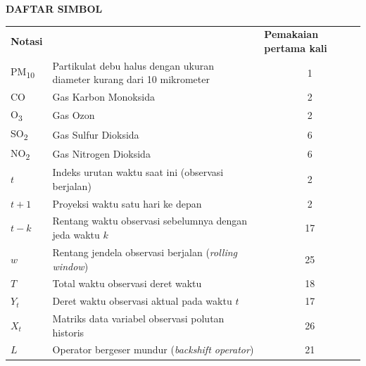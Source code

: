 \cleardoublepage
\vspace{2cm}
\begin{center}
{\fontsize{14}{16.8}\selectfont\textbf{DAFTAR SIMBOL}}\\[1em]
\end{center}
\label{chap:simbol}
\setcounter{chapter}{0}
\setcounter{section}{0}
\vspace{2em}

\begin{longtable}{@{} l >{\raggedright\arraybackslash}p{6.5cm} c @{}}
\multicolumn{1}{l}{\textbf{Notasi}} & \multicolumn{1}{l}{\textbf{Deskripsi}} & \multicolumn{1}{l}{\parbox[c]{3.5cm}{\raggedright \textbf{Pemakaian pertama kali}}} \\


PM\textsubscript{10} & Partikulat debu halus dengan ukuran diameter kurang dari 10 mikrometer & 1 \\
CO & Gas Karbon Monoksida & 2 \\
O\textsubscript{3} & Gas Ozon & 2 \\
SO\textsubscript{2} & Gas Sulfur Dioksida & 6 \\
NO\textsubscript{2} & Gas Nitrogen Dioksida & 6 \\[1ex]


$t$ & Indeks urutan waktu saat ini (observasi berjalan) & 2 \\
$t+1$ & Proyeksi waktu satu hari ke depan & 2 \\
$t-k$ & Rentang waktu observasi sebelumnya dengan jeda waktu $k$ & 17 \\
$w$ & Rentang jendela observasi berjalan (\textit{rolling window}) & 25 \\
$T$ & Total waktu observasi deret waktu & 18 \\
$Y_t$ & Deret waktu observasi aktual pada waktu $t$ & 17 \\
$X_t$ & Matriks data variabel observasi polutan historis & 26 \\
$L$ & Operator bergeser mundur (\textit{backshift operator}) & 21 \\[1ex]



\end{longtable}
